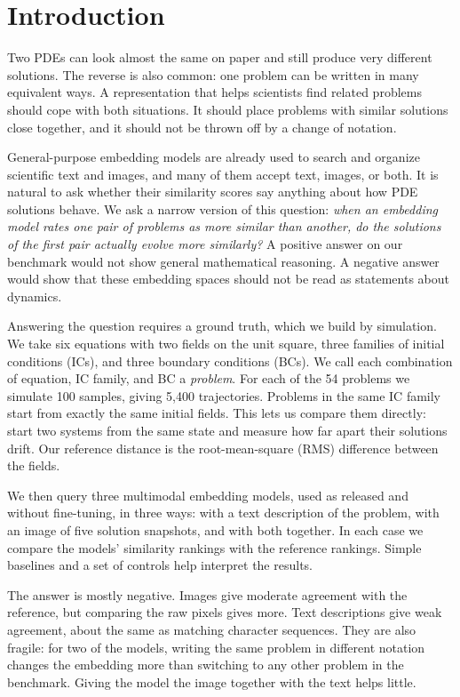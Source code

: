 \section{Introduction}
Two PDEs can look almost the same on paper and still produce very different solutions. The reverse is also common: one problem can be written in many equivalent ways. A representation that helps scientists find related problems should cope with both situations. It should place problems with similar solutions close together, and it should not be thrown off by a change of notation.

General-purpose embedding models are already used to search and organize scientific text and images, and many of them accept text, images, or both. It is natural to ask whether their similarity scores say anything about how PDE solutions behave. We ask a narrow version of this question: \emph{when an embedding model rates one pair of problems as more similar than another, do the solutions of the first pair actually evolve more similarly?} A positive answer on our benchmark would not show general mathematical reasoning. A negative answer would show that these embedding spaces should not be read as statements about dynamics.

Answering the question requires a ground truth, which we build by simulation. We take six equations with two fields on the unit square, three families of initial conditions (ICs), and three boundary conditions (BCs). We call each combination of equation, IC family, and BC a \emph{problem}. For each of the 54 problems we simulate 100 samples, giving 5,400 trajectories. Problems in the same IC family start from exactly the same initial fields. This lets us compare them directly: start two systems from the same state and measure how far apart their solutions drift. Our reference distance is the root-mean-square (RMS) difference between the fields.

We then query three multimodal embedding models, used as released and without fine-tuning, in three ways: with a text description of the problem, with an image of five solution snapshots, and with both together. In each case we compare the models' similarity rankings with the reference rankings. Simple baselines and a set of controls help interpret the results.

The answer is mostly negative. Images give moderate agreement with the reference, but comparing the raw pixels gives more. Text descriptions give weak agreement, about the same as matching character sequences. They are also fragile: for two of the models, writing the same problem in different notation changes the embedding more than switching to any other problem in the benchmark. Giving the model the image together with the text helps little.

